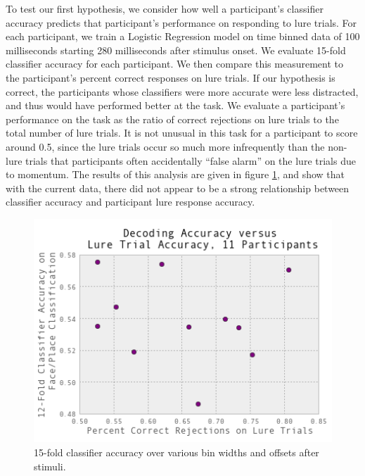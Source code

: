 \documentclass[12pt]{report}
\begin{document}
	To test our first hypothesis, we consider how well a participant's classifier accuracy predicts that participant's performance on responding to lure trials.  For each participant, we train a Logistic Regression model on time binned data of 100 milliseconds starting 280 milliseconds after stimulus onset.  We evaluate 15-fold classifier accuracy for each participant.  We then compare this measurement to the participant's percent correct responses on lure trials.  If our hypothesis is correct, the participants whose classifiers were more accurate were less distracted, and thus would have performed better at the task.  We evaluate a participant's performance on the task as the ratio of correct rejections on lure trials to the total number of lure trials.  It is not unusual in this task for a participant to score around 0.5, since the lure trials occur so much more infrequently than the non-lure trials that participants often accidentally ``false alarm'' on the lure trials due to momentum.  The results of this analysis are given in figure \ref{responsevsclass}, and show that with the current data, there did not appear to be a strong relationship between classifier accuracy and participant lure response accuracy.

\begin{figure}[t]
\centerline{
	\includegraphics[width=4.5in]{response_acc_vs_class_acc}
}
\caption{15-fold classifier accuracy over various bin widths and offsets after stimuli.\label{responsevsclass}}
\end{figure}
\end{document}
